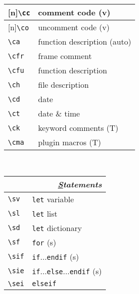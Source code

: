 \documentclass[oneside,10pt,landscape,DIV16]{scrartcl}
\newcommand{\Rep}{{\scriptsize{[n]}}}
\begin{document}
\begin{multicols}{3}
\begin{center}
\begin{tabular}[]{|p{11mm}|p{58mm}|}
\hline \Rep\verb'\cc'   & comment code                      \hfill (v)\\
\hline \Rep\verb'\co'   & uncomment code                    \hfill (v)\\
\hline     \verb'\ca'   & function description (auto)       \\
%
\hline     \verb'\cfr'  & frame comment                     \\
\hline     \verb'\cfu'  & function description              \\
\hline     \verb'\ch'   & file description                  \\
\hline     \verb'\cd'   & date                              \\
\hline     \verb'\ct'   & date \& time                      \\
\hline
%
\hline     \verb'\ck'   & keyword comments                  \hfill (T)\\
\hline     \verb'\cma'  & plugin macros                     \hfill (T)\\
\hline
\end{tabular}\\
%
%
\begin{tabular}[]{|p{11mm}|p{58mm}|}
\hline
\multicolumn{2}{|r|}{\textsl{\underline{S}tatements}}\\[1.0ex]
\hline \verb'\sv'     & \verb'let' variable                              \\
\hline \verb'\sl'     & \verb'let' list                                  \\
\hline \verb'\sd'     & \verb'let' dictionary                            \\
\hline \verb'\sf'     & \verb'for'                                       \hfill (s)\\
\hline \verb'\sif'    & \verb'if'$\ldots$\verb'endif'                    \hfill (s)\\
\hline \verb'\sie'    & \verb'if'$\ldots$\verb'else'$\ldots$\verb'endif' \hfill (s)\\
\hline \verb'\sei'    & \verb'elseif'                                    \\

\end{tabular}
\end{center}
\end{multicols}
\end{document}
